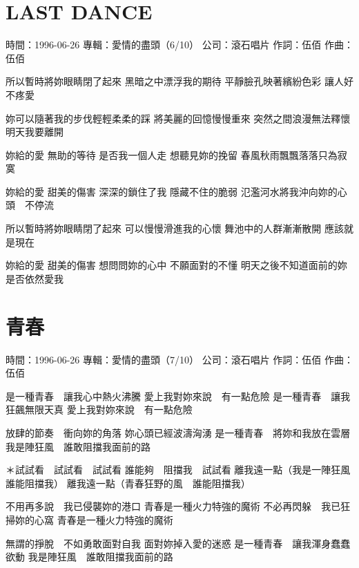 \documentclass[UTF8,a4paper,oneside,twocolumn,12pt]{ctexbook}
\newcommand{\infopair}[2]{\textbullet #1：#2}
\newcommand{\zc}[1][伍佰]{\infopair{作詞}{#1}}
\newcommand{\zq}[1][伍佰]{\infopair{作曲}{#1}}
\newcommand{\zj}[1]{\infopair{專輯}{#1}}
\newcommand{\sj}[1]{\infopair{時間}{#1}}
\newcommand{\gs}[1]{\infopair{公司}{#1}}
\newenvironment{info}{\begin{flushleft}\kaishu
	}
	{\end{flushleft}\normalsize\yahei\par}
\newenvironment{lyric}{
	}
{}
\begin{document}
\section{LAST DANCE}
\begin{info}
	\sj{1996-06-26}
	\zj{愛情的盡頭（6/10）}
	\gs{滾石唱片}
	\zc
	\zq
\end{info}
\begin{lyric}
	所以暫時將妳眼睛閉了起來
	黑暗之中漂浮我的期待
	平靜臉孔映著繽紛色彩
	讓人好不疼愛

	妳可以隨著我的步伐輕輕柔柔的踩
	將美麗的回憶慢慢重來
	突然之間浪漫無法釋懷
	明天我要離開

	妳給的愛
	無助的等待
	是否我一個人走
	想聽見妳的挽留
	春風秋雨飄飄落落只為寂寞

	妳給的愛
	甜美的傷害
	深深的鎖住了我
	隱藏不住的脆弱
	氾濫河水將我沖向妳的心頭　不停流

	所以暫時將妳眼睛閉了起來
	可以慢慢滑進我的心懷
	舞池中的人群漸漸散開
	應該就是現在

	妳給的愛
	甜美的傷害
	想問問妳的心中
	不願面對的不懂
	明天之後不知道面前的妳是否依然愛我
\end{lyric}

\section{青春}
\begin{info}
	\sj{1996-06-26}
	\zj{愛情的盡頭（7/10）}
	\gs{滾石唱片}
	\zc
	\zq
\end{info}
\begin{lyric}
	是一種青春　讓我心中熱火沸騰
	愛上我對妳來說　有一點危險
	是一種青春　讓我狂飆無限天真
	愛上我對妳來說　有一點危險

	放肆的節奏　衝向妳的角落
	妳心頭已經波濤洶湧
	是一種青春　將妳和我放在雲層
	我是陣狂風　誰敢阻擋我面前的路

	＊試試看　試試看　試試看
	誰能夠　阻擋我　試試看
	離我遠一點（我是一陣狂風　誰能阻擋我）
	離我遠一點（青春狂野的風　誰能阻擋我）

	不用再多說　我已侵襲妳的港口
	青春是一種火力特強的魔術
	不必再閃躲　我已狂掃妳的心窩
	青春是一種火力特強的魔術

	無謂的掙脫　不如勇敢面對自我
	面對妳掉入愛的迷惑
	是一種青春　讓我渾身蠢蠢欲動
	我是陣狂風　誰敢阻擋我面前的路
\end{lyric}
\end{document}
